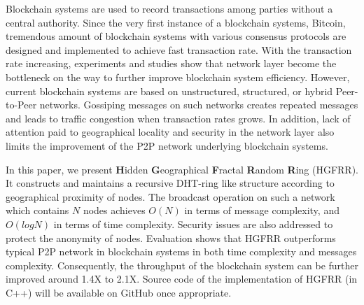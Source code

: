 Blockchain systems are used to record transactions among parties without a central authority. Since the very first instance of a blockchain systems, Bitcoin, tremendous amount of blockchain systems with various consensus protocols are designed and implemented to achieve fast transaction rate. With the transaction rate increasing, experiments and studies show that network layer become the bottleneck on the way to further improve blockchain system efficiency. However, current blockchain systems are based on unstructured, structured, or hybrid Peer-to-Peer networks. Gossiping messages on such networks creates repeated messages and leads to traffic congestion when transaction rates grows. In addition, lack of attention paid to geographical locality and security in the network layer also limits the improvement of the P2P network underlying blockchain systems.

In this paper, we present \textbf{H}idden \textbf{G}eographical \textbf{F}ractal \textbf{R}andom \textbf{R}ing (HGFRR). It constructs and maintains a recursive DHT-ring like structure according to geographical proximity of nodes. The broadcast operation on such a network which contains $N$ nodes achieves $O(N)$ in terms of message complexity, and $O(logN)$ in terms of time complexity. Security issues are also addressed to protect the anonymity of nodes. Evaluation shows that HGFRR outperforms typical P2P network in blockchain systems in both time complexity and messages complexity. Consequently, the throughput of the blockchain system can be further improved around 1.4X to 2.1X. Source code of the implementation of HGFRR (in C++) will be available on GitHub once appropriate.